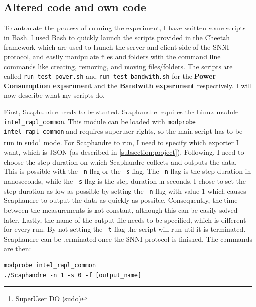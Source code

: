 \documentclass[../thesis.tex]{subfiles}
\begin{document}
\subsection{Altered code and own code}\label{subsection:scripts}
To automate the process of running the experiment, I have written some scripts in Bash. I used Bash to quickly launch the scripts provided in the Cheetah framework which are used to launch the server and client side of the SNNI protocol, and easily manipulate files and folders with the command line commands like creating, removing, and moving files/folders. The scripts are called \verb|run_test_power.sh| and \verb|run_test_bandwith.sh| for the \textbf{Power Consumption experiment} and the \textbf{Bandwith experiment} respectively. I will now describe what my scripts do. 

First, Scaphandre needs to be started. Scaphandre requires the Linux module \verb|intel_rapl_common|. This module can be loaded with \verb|modprobe intel_rapl_common| and requires superuser rights, so the main script has to be run in sudo\footnote{SuperUser DO (sudo)} mode. For Scaphandre to run, I need to specify which exporter I want, which is JSON (as described in \ref{subsection:project}). Following, I need to choose the step duration on which Scaphandre collects and outputs the data. This is possible with the \verb|-n| flag or the \verb|-s| flag. The \verb|-n| flag is the step duration in nanoseconds, while the \verb|-s| flag is the step duration in seconds. I chose to set the step duration as low as possible by setting the \verb|-n| flag with value 1 which causes Scaphandre to output the data as quickly as possible. Consequently, the time between the measurements is not constant, although this can be easily solved later. Lastly, the name of the output file needs to be specified, which is different for every run. By not setting the \verb|-t| flag the script will run util it is terminated. Scaphandre can be terminated once the SNNI protocol is finished. The commands are then:
\begin{lstlisting}[language={Cplusplus}]
modprobe intel_rapl_common
./Scaphandre -n 1 -s 0 -f [output_name]
\end{lstlisting}

\end{document}
